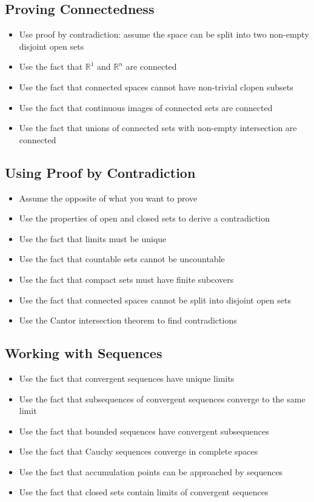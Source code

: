 \subsection*{Proving Connectedness}
\begin{itemize}
\item Use proof by contradiction: assume the space can be split into two non-empty disjoint open sets
\item Use the fact that $\mathbb{R}^1$ and $\mathbb{R}^n$ are connected
\item Use the fact that connected spaces cannot have non-trivial clopen subsets
\item Use the fact that continuous images of connected sets are connected
\item Use the fact that unions of connected sets with non-empty intersection are connected
\end{itemize}

\subsection*{Using Proof by Contradiction}
\begin{itemize}
\item Assume the opposite of what you want to prove
\item Use the properties of open and closed sets to derive a contradiction
\item Use the fact that limits must be unique
\item Use the fact that countable sets cannot be uncountable
\item Use the fact that compact sets must have finite subcovers
\item Use the fact that connected spaces cannot be split into disjoint open sets
\item Use the Cantor intersection theorem to find contradictions
\end{itemize}

\subsection*{Working with Sequences}
\begin{itemize}
\item Use the fact that convergent sequences have unique limits
\item Use the fact that subsequences of convergent sequences converge to the same limit
\item Use the fact that bounded sequences have convergent subsequences
\item Use the fact that Cauchy sequences converge in complete spaces
\item Use the fact that accumulation points can be approached by sequences
\item Use the fact that closed sets contain limits of convergent sequences
\end{itemize}


